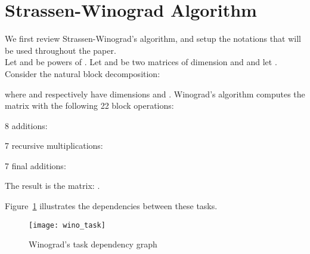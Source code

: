 \documentclass{article}
\begin{document}
\section{Strassen-Winograd Algorithm}\label{sec:algo}
We first review Strassen-Winograd's algorithm, and setup the notations that
will be used throughout the paper.\\
Let  and  be powers of .
Let  and  be two matrices of dimension  and  and
let .
Consider the natural block decomposition:

where  and  respectively have dimensions  and .
Winograd's algorithm computes the  matrix  with the
following 22 block operations:\\
\begin{inparaenum}[\xspace]
\item 8 additions:

\item 7 recursive multiplications:
\item 7 final additions:

\item The result is the matrix:
{ }.
\end{inparaenum}

Figure~\ref{fig:winotask} illustrates the dependencies between these tasks.
\begin{figure}[htb]
\begin{center}
\texttt{[image: wino\_task]}
\caption{Winograd's task dependency graph}
\label{fig:winotask}
\end{center}
\end{figure}
\end{document}

